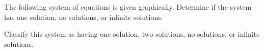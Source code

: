 \documentclass{ximera}
\author{Elizabeth Miller, Kenneth Berglund}
\begin{document}
The following system of equations is given graphically.  Determine if the system has one solution, no solutions, or infinite solutions.

\begin{image}
\end{image}

\begin{exercise}
Classify this system as having one solution, two solutions, no solutions, or infinite solutions.
\begin{multipleChoice}  
\end{multipleChoice}  




\end{exercise}
\end{document}
